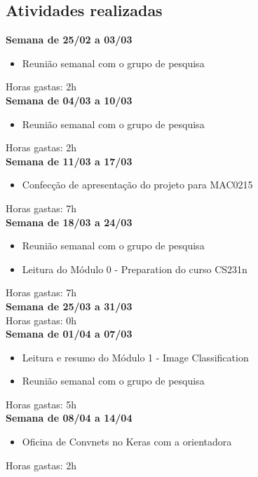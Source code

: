\documentclass{article}
\begin{document}
	\begin{appendices}		
		{\setlength{\parindent}{0cm}
		\section{Atividades realizadas}
			\label{appendix:atividades}
			\textbf{Semana de 25/02 a 03/03} 
			\begin{itemize}
				\item Reunião semanal com o grupo de pesquisa
			\end{itemize}			
			Horas gastas: 2h \\
			
			\textbf{Semana de 04/03 a 10/03}
			\begin{itemize}
				\item Reunião semanal com o grupo de pesquisa 
			\end{itemize}
			Horas gastas: 2h \\
			
			\textbf{Semana de 11/03 a 17/03}
			\begin{itemize}	
				\item Confecção de apresentação do projeto para MAC0215
			\end{itemize}			 
			Horas gastas: 7h \\
			
			\textbf{Semana de 18/03 a 24/03}
			\begin{itemize}
				\item Reunião semanal com o grupo de pesquisa 
				\item Leitura do Módulo 0 - Preparation do curso CS231n
			\end{itemize}
			Horas gastas: 7h \\
			
			\textbf{Semana de 25/03 a 31/03} \\
			Horas gastas: 0h \\
			
			\textbf{Semana de 01/04 a 07/03}
			\begin{itemize}
				\item Leitura e resumo do Módulo 1 - Image Classification 
				\item Reunião semanal com o grupo de pesquisa 
			\end{itemize}
			Horas gastas: 5h \\
			
			\textbf{Semana de 08/04 a 14/04}
			\begin{itemize}
				\item Oficina de Convnets no Keras com a orientadora 			
			\end{itemize}
			Horas gastas: 2h \\
			
}
\end{appendices}
\end{document}
